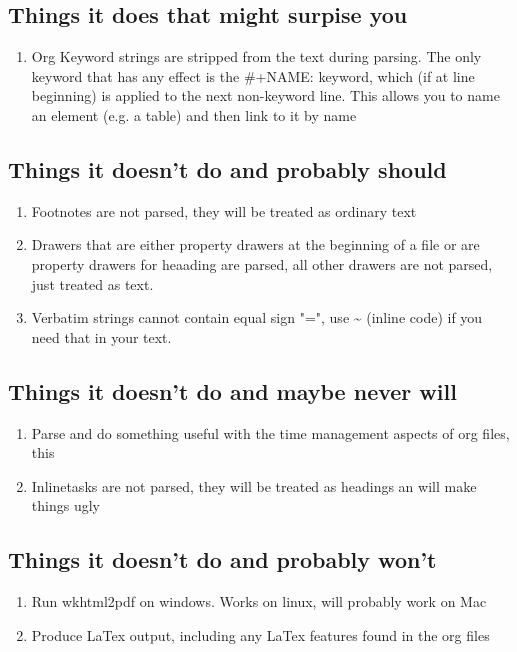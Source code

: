 \documentclass[11pt]{article}
\begin{document}
\subsection{Things it does that might surpise you  }
 \label{obj-107}
 \label{obj-106}
\begin{enumerate}
\item
Org Keyword strings are stripped from the text during parsing. The only keyword that has
  any effect is the \#+NAME: keyword, which (if at line beginning) is applied to the next
  non-keyword line. This allows you to name an element (e.g. a table) and then link to
  it by name

\end{enumerate}
\subsection{Things it doesn't do and probably should  }
 \label{obj-117}
 \label{obj-116}
\begin{enumerate}
\item
Footnotes are not parsed, they will be treated as ordinary text
\item
Drawers that are either property drawers at the beginning of a file or are property drawers for
  heaading are parsed, all other drawers are not parsed, just treated as text.

\item
Verbatim strings cannot contain equal sign "=", use \textasciitilde{} (inline code) if you need that in your text.
\end{enumerate}
\subsection{Things it doesn't do and maybe never will  }
 \label{obj-129}
 \label{obj-128}
\begin{enumerate}
\item
Parse and do something useful with the time management aspects of org files, this
\item
Inlinetasks are not parsed, they will be treated as headings an will make things ugly
\end{enumerate}
\subsection{Things it doesn't do and probably won't  }
 \label{obj-137}
 \label{obj-136}
\begin{enumerate}
\item
Run wkhtml2pdf on windows. Works on linux, will probably work on Mac
\item
Produce LaTex output, including any LaTex features found in the org files
\end{enumerate}
\end{document}
